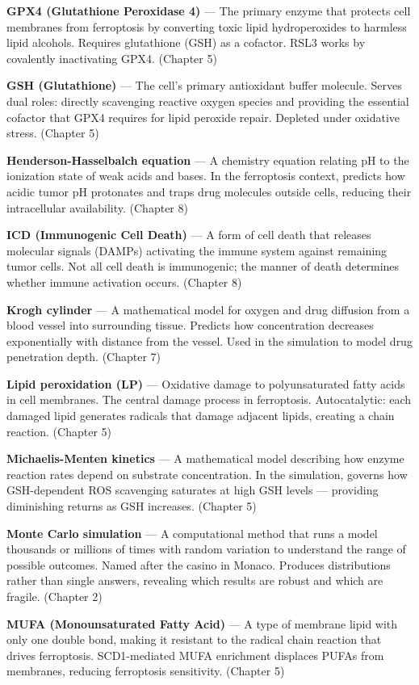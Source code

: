 \documentclass[11pt,twoside,openright]{report}
\begin{document}
\textbf{GPX4 (Glutathione Peroxidase 4)} --- The primary enzyme that protects cell membranes from ferroptosis by converting toxic lipid hydroperoxides to harmless lipid alcohols. Requires glutathione (GSH) as a cofactor. RSL3 works by covalently inactivating GPX4. (Chapter 5)

\textbf{GSH (Glutathione)} --- The cell's primary antioxidant buffer molecule. Serves dual roles: directly scavenging reactive oxygen species and providing the essential cofactor that GPX4 requires for lipid peroxide repair. Depleted under oxidative stress. (Chapter 5)

\textbf{Henderson-Hasselbalch equation} --- A chemistry equation relating pH to the ionization state of weak acids and bases. In the ferroptosis context, predicts how acidic tumor pH protonates and traps drug molecules outside cells, reducing their intracellular availability. (Chapter 8)

\textbf{ICD (Immunogenic Cell Death)} --- A form of cell death that releases molecular signals (DAMPs) activating the immune system against remaining tumor cells. Not all cell death is immunogenic; the manner of death determines whether immune activation occurs. (Chapter 8)

\textbf{Krogh cylinder} --- A mathematical model for oxygen and drug diffusion from a blood vessel into surrounding tissue. Predicts how concentration decreases exponentially with distance from the vessel. Used in the simulation to model drug penetration depth. (Chapter 7)

\textbf{Lipid peroxidation (LP)} --- Oxidative damage to polyunsaturated fatty acids in cell membranes. The central damage process in ferroptosis. Autocatalytic: each damaged lipid generates radicals that damage adjacent lipids, creating a chain reaction. (Chapter 5)

\textbf{Michaelis-Menten kinetics} --- A mathematical model describing how enzyme reaction rates depend on substrate concentration. In the simulation, governs how GSH-dependent ROS scavenging saturates at high GSH levels --- providing diminishing returns as GSH increases. (Chapter 5)

\textbf{Monte Carlo simulation} --- A computational method that runs a model thousands or millions of times with random variation to understand the range of possible outcomes. Named after the casino in Monaco. Produces distributions rather than single answers, revealing which results are robust and which are fragile. (Chapter 2)

\textbf{MUFA (Monounsaturated Fatty Acid)} --- A type of membrane lipid with only one double bond, making it resistant to the radical chain reaction that drives ferroptosis. SCD1-mediated MUFA enrichment displaces PUFAs from membranes, reducing ferroptosis sensitivity. (Chapter 5)
\end{document}
